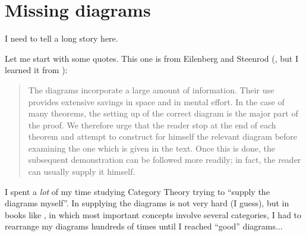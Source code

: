 \documentclass[oneside,12pt]{article}
\begin{document}

%

\tableofcontents






%

\section{Missing diagrams}
\label{missing-diagrams}

I need to tell a long story here.

Let me start with some quotes. This one is from Eilenberg and Steenrod
(\cite[p.ix]{EilenbergSteenrod}, but I learned it from
\cite[pp.82--83]{Kromer}):

\begin{quotation}

  The diagrams incorporate a large amount of information. Their use
  provides extensive savings in space and in mental effort. In the
  case of many theorems, the setting up of the correct diagram is the
  major part of the proof. We therefore urge that the reader stop at
  the end of each theorem and attempt to construct for himself the
  relevant diagram before examining the one which is given in the
  text. Once this is done, the subsequent demonstration can be
  followed more readily; in fact, the reader can usually supply it
  himself.

\end{quotation}

I spent a {\sl lot} of my time studying Category Theory trying to
``supply the diagrams myself''. In \cite{EilenbergSteenrod} supplying
the diagrams is not very hard (I guess), but in books like
\cite{CWM2}, in which most important concepts involve several
categories, I had to rearrange my diagrams hundreds of times until I
reached ``good'' diagrams...

\end{document}
